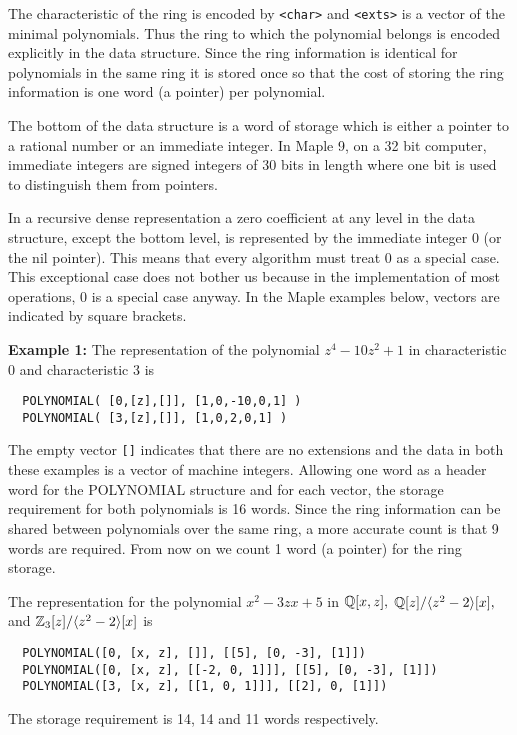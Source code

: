 \documentclass[10pt]{article}
\begin{document}
\noindent
The characteristic of the ring is encoded by \verb+<char>+
and \verb+<exts>+ is a vector of the minimal polynomials.
Thus the ring to which the polynomial belongs is encoded
explicitly in the data structure.  Since the ring information
is identical for polynomials in the same ring it is stored
once so that the cost of storing the ring information
is one word (a pointer) per polynomial.

The bottom of the data structure is a word of storage which is
either a pointer to a rational number or an immediate integer.
In Maple 9, on a 32 bit computer, immediate integers are signed
integers of 30 bits in length where one bit is used to distinguish
them from pointers.



In a recursive dense representation a zero coefficient at any level
in the data structure, except the bottom level, is represented by
the immediate integer 0 (or the nil pointer). This means that every
algorithm must treat 0 as a special case. This exceptional case does
not bother us because in the implementation of most operations, 0 is
a special case anyway. In the Maple examples below, vectors are
indicated by square brackets.

\medskip
\noindent
{\bf Example 1:} The representation of the polynomial
$z^4-10 z^2 + 1$ in characteristic 0 and characteristic 3 is
\begin{verbatim}
  POLYNOMIAL( [0,[z],[]], [1,0,-10,0,1] )
  POLYNOMIAL( [3,[z],[]], [1,0,2,0,1] )
\end{verbatim}
The empty vector \verb+[]+ indicates that there are no extensions and the
data in both these examples is a vector of machine integers.
Allowing one word as a header word for the POLYNOMIAL structure and for
each vector, the storage requirement for both polynomials is 16 words.
Since the ring information can be shared between polynomials over the same
ring, a more accurate count is that 9 words are required. From
now on we count 1 word (a pointer) for the ring storage.

\medskip
{} The representation for the polynomial
$x^2 - 3 z x + 5$ in ${\mathbb Q}[x,z],$ ${\mathbb Q}[z]/\langle z^2-2 \rangle [x],$
and ${\mathbb Z}_3[z]/ \langle z^2-2 \rangle [x]$ is
\begin{verbatim}
  POLYNOMIAL([0, [x, z], []], [[5], [0, -3], [1]])
  POLYNOMIAL([0, [x, z], [[-2, 0, 1]]], [[5], [0, -3], [1]])
  POLYNOMIAL([3, [x, z], [[1, 0, 1]]], [[2], 0, [1]])
\end{verbatim}
\noindent
The storage requirement is 14, 14 and 11 words respectively.
\end{document}
